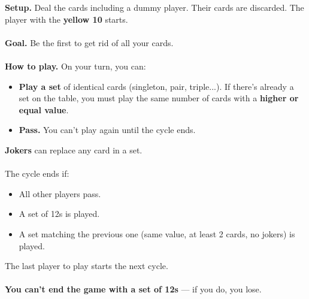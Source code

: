 \documentclass[a4paper]{memoir}
\begin{document}
{\footnotesize


\noindent
\textbf{ Setup.}  
Deal the cards including a dummy player. Their cards are discarded. The player with the \textbf{yellow 10} starts.
\\
\\
\noindent
\textbf{ Goal.}  
Be the first to get rid of all your cards.
\\
\\
\noindent
\textbf{ How to play.}  
On your turn, you can:
\begin{itemize}
    \item \textbf{Play a set} of identical cards (singleton, pair, triple...).  
    If there's already a set on the table, you must play the same number of cards with a \textbf{higher or equal value}.
    
    \item \textbf{Pass.}  
    You can’t play again until the cycle ends.
\end{itemize}

\noindent
{} \textbf{Jokers} can replace any card in a set.
\\
\\
\noindent
{} The cycle ends if:
\begin{itemize}
    \item All other players pass.
    \item A set of 12s is played.
    \item A set matching the previous one (same value, at least 2 cards, no jokers) is played.
\end{itemize}
The last player to play starts the next cycle.
\\
\\
 \textbf{You can’t end the game with a set of 12s} — if you do, you lose.

}
\end{document}
